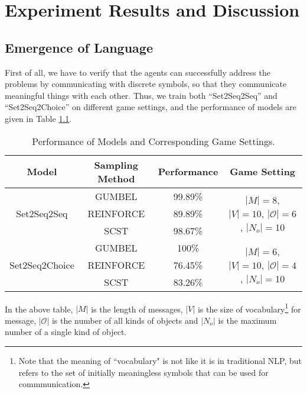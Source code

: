 \chapter{Experiment Results and Discussion}
\label{ch4:results_analysis}

\section{Emergence of Language}
\label{sec4.1:emergence}

First of all, we have to verify that the agents can successfully address the problems by communicating with discrete symbols, so that they communicate meaningful things with each other. Thus, we train both ``Set2Seq2Seq'' and ``Set2Seq2Choice'' on different game settings, and the performance of models are given in Table \ref{tab4.1:game_performance}.

\begin{table}[!h]
    \centering
    \begin{tabular}{|c|c|c|c|}
        \hline
        Model                           & Sampling Method & Performance & Game Setting      \\ \hline
        \multirow{3}{*}{Set2Seq2Seq}    & GUMBEL          & 99.89\%     & \multirow{3}{1.5in}{$|M|=8$, $|V|=10$, $|\mathcal{O}|=6$, $|N_{o}|=10$} \\ \cline{2-3}
                                        & REINFORCE       & 89.89\%     &                   \\ \cline{2-3}
                                        & SCST            & 98.67\%     &                   \\ \hline
        \multirow{3}{*}{Set2Seq2Choice} & GUMBEL          & 100\%       & \multirow{3}{1.5in}{$|M|=6$, $|V|=10$, $|\mathcal{O}|=4$, $|N_{o}|=10$} \\ \cline{2-3}
                                        & REINFORCE       & 76.45\%     &                   \\ \cline{2-3}
                                        & SCST            & 83.26\%     &                   \\ \hline
        \end{tabular}
    \caption{Performance of Models and Corresponding Game Settings.}
    \label{tab4.1:game_performance}
\end{table}

In the above table, $|M|$ is the length of messages, $|V|$ is the size of vocabulary\footnote{Note that the meaning of ``vocabulary" is not like it is in traditional NLP, but refers to the set of initially meaningless symbols that can be used for commmunication.} for message, $|\mathcal{O}|$ is the number of all kinds of objects and $|N_o|$ is the maximum number of a single kind of object.


